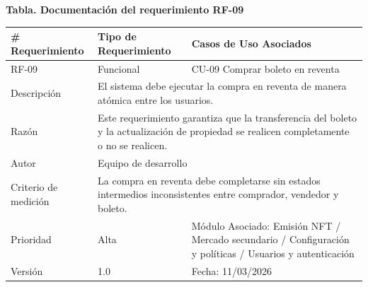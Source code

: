 \documentclass[12pt,letterpaper]{article}
\begin{document}
\noindent
\begin{minipage}{\textwidth}
\centering
\scriptsize
\renewcommand{\arraystretch}{0.9}
\setlength{\tabcolsep}{3pt}
\setlength{\arrayrulewidth}{0.5pt}

\textbf{Tabla. Documentación del requerimiento RF-09}

\vspace{2pt}

\begin{tabularx}{\textwidth}{|p{2.6cm}|X|p{3.4cm}|}
\hline
\# Requerimiento & Tipo de Requerimiento & Casos de Uso Asociados \\ \hline
RF-09 & Funcional & CU-09 Comprar boleto en reventa \\ \hline
Descripción & \multicolumn{2}{X|}{El sistema debe ejecutar la compra en reventa de manera atómica entre los usuarios.} \\ \hline
Razón & \multicolumn{2}{X|}{Este requerimiento garantiza que la transferencia del boleto y la actualización de propiedad se realicen completamente o no se realicen.} \\ \hline
Autor & \multicolumn{2}{X|}{Equipo de desarrollo} \\ \hline
Criterio de medición & \multicolumn{2}{X|}{La compra en reventa debe completarse sin estados intermedios inconsistentes entre comprador, vendedor y boleto.} \\ \hline
Prioridad & Alta & Módulo Asociado: Emisión NFT / Mercado secundario / Configuración y políticas / Usuarios y autenticación \\ \hline
Versión & 1.0 & Fecha: 11/03/2026 \\ \hline
\end{tabularx}
\end{minipage}

\vspace{0.2cm}
\end{document}
